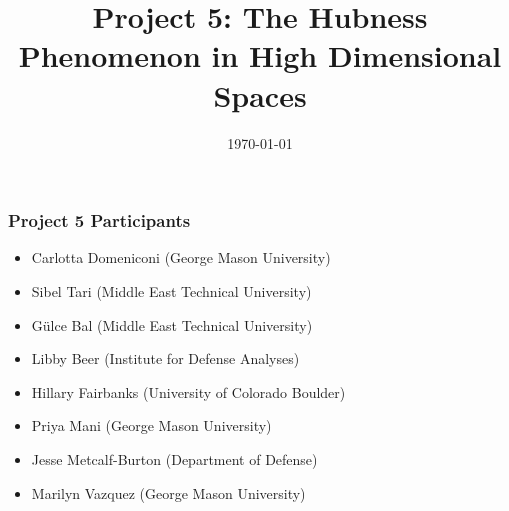 \documentclass{beamer}
\title[Hubness]{Project 5: The Hubness Phenomenon in High Dimensional Spaces} %
\author[]{} %
\date{\today} %
\begin{document}
\begin{frame}
\titlepage %
\end{frame}






\begin{frame}
\frametitle{Project 5 Participants}

\begin{itemize}
\item Carlotta Domeniconi (George Mason University)
\item Sibel Tari (Middle East Technical University)
\end{itemize}

\begin{itemize}
\item G\"{u}lce Bal (Middle East Technical University)
\item Libby Beer (Institute for Defense Analyses)
\item Hillary Fairbanks (University of Colorado Boulder)
\item Priya Mani (George Mason University)
\item Jesse Metcalf-Burton (Department of Defense)
\item Marilyn Vazquez (George Mason University)
\end{itemize}
\end{frame}
\end{document}
